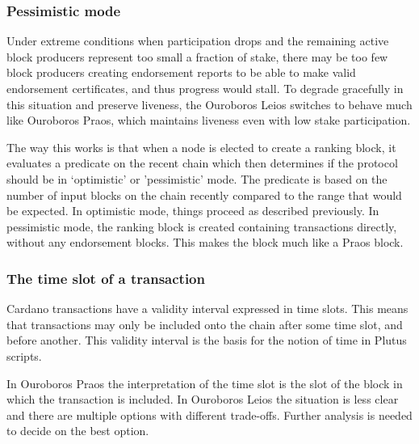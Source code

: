 \documentclass[11pt,a4paper]{article}
\begin{document}
\subsubsection{Pessimistic mode}
Under extreme conditions when participation drops and the remaining active
block producers represent too small a fraction of stake, there may be too
few block producers creating endorsement reports to be able to make valid
endorsement certificates, and thus progress would stall. To degrade gracefully
in this situation and preserve liveness, the Ouroboros Leios switches to behave
much like Ouroboros Praos, which maintains liveness even with low stake
participation.

The way this works is that when a node is elected to create a ranking block, it
evaluates a predicate on the recent chain which then determines if the protocol
should be in `optimistic' or 'pessimistic' mode. The predicate is based on the
number of input blocks on the chain recently compared to the range that would
be expected. In optimistic mode, things proceed as described previously. In
pessimistic mode, the ranking block is created containing transactions directly,
without any endorsement blocks. This makes the block much like a Praos block.

\subsubsection{The time slot of a transaction}
Cardano transactions have a validity interval expressed in time slots. This
means that transactions may only be included onto the chain after some time
slot, and before another. This validity interval is the basis for the notion of
time in Plutus scripts.

In Ouroboros Praos the interpretation of the time slot is the slot of the block
in which the transaction is included. In Ouroboros Leios the situation is less
clear and there are multiple options with different trade-offs. Further
analysis is needed to decide on the best option.
\end{document}
